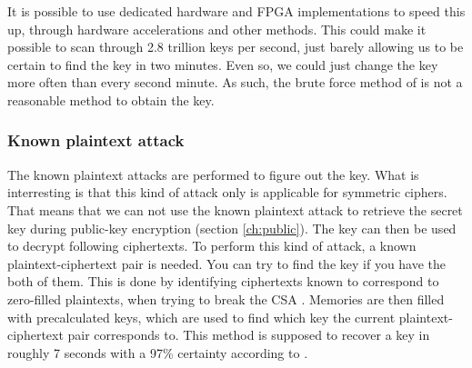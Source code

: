 It is possible to use dedicated hardware and FPGA implementations to 
speed this up, through hardware accelerations and other methods. This 
could make it possible to scan through 2.8 trillion keys per second, 
just barely allowing us to be certain to find the key in two minutes. 
Even so, we could just change the key more often than every second 
minute. As such, the brute force method of is not a reasonable method 
to obtain the key.

\subsubsection{Known plaintext attack}\label{sec:kpa}
The known plaintext attacks are performed to figure out the key. What 
is interresting is that this kind of attack only is applicable for 
symmetric ciphers. That means that we can not use the known plaintext 
attack to retrieve the secret key during public-key encryption 
(section \ref{ch:public}). The key can then be used to decrypt 
following ciphertexts. To perform this kind of attack, a known 
plaintext-ciphertext pair is needed. You can try to find the key if 
you have the both of them. This is done by identifying ciphertexts 
known to correspond to zero-filled plaintexts, when trying to break the 
CSA \citep{Breaking:2012}. Memories are then filled with precalculated 
keys, which are used to find which key the current plaintext-ciphertext 
pair corresponds to. This method is supposed to recover a key in 
roughly 7 seconds with a 97\% certainty according to 
\citet{Breaking:2012}.
